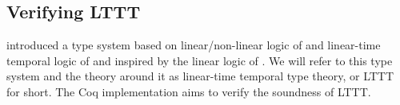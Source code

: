 \subsection{Verifying LTTT}

\cite{Paykin2016TheEO} introduced a type system based on linear/non-linear logic of \cite{DBLP:conf/csl/Benton94} and linear-time temporal logic of \cite{DBLP:conf/focs/Pnueli77} and inspired by the linear logic of \cite{DBLP:journals/tcs/Girard87}. We will refer to this type system and the theory around it as linear-time temporal type theory, or LTTT for short. The Coq implementation aims to verify the soundness of LTTT.








